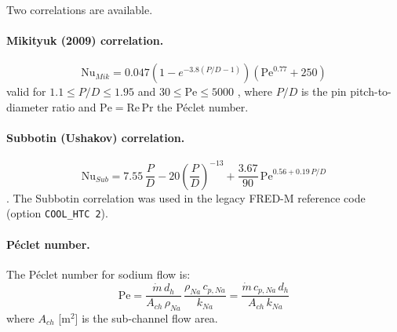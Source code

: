 \begin{refsection}
Two correlations are available.

\paragraph{Mikityuk (2009) correlation.}
\begin{equation}
  \mathrm{Nu}_{Mik} = 0.047\!\left(1 - e^{-3.8(P/D - 1)}\right)
                      \!\left(\mathrm{Pe}^{0.77} + 250\right)
  \label{eq:nu_mikityuk}
\end{equation}
valid for $1.1 \leq P/D \leq 1.95$ and $30 \leq \mathrm{Pe} \leq 5000$ \cite{mikityuk2009}, where $P/D$ is the pin pitch-to-diameter ratio and $\mathrm{Pe} = \mathrm{Re}\,\mathrm{Pr}$ the Péclet number.

\paragraph{Subbotin (Ushakov) correlation.}
\begin{equation}
  \mathrm{Nu}_{Sub} = 7.55\,\frac{P}{D} - 20\left(\frac{P}{D}\right)^{-13}
                      + \frac{3.67}{90}\,\mathrm{Pe}^{0.56 + 0.19\,P/D}
  \label{eq:nu_subbotin}
\end{equation}
\cite{subbotin1962}.  The Subbotin correlation was used in the legacy FRED-M reference code (option \texttt{COOL\_HTC 2}).

\paragraph{Péclet number.} The Péclet number for sodium flow is:
\begin{equation}
  \mathrm{Pe} = \frac{\dot{m}\,d_h}{A_{ch}\,\rho_{Na}}\,
                \frac{\rho_{Na}\,c_{p,Na}}{k_{Na}}
              = \frac{\dot{m}\,c_{p,Na}\,d_h}{A_{ch}\,k_{Na}}
  \label{eq:peclet}
\end{equation}
where $A_{ch}$ [m$^2$] is the sub-channel flow area.

\printbibliography[heading=subbibliography,title={References}]
\end{refsection}
